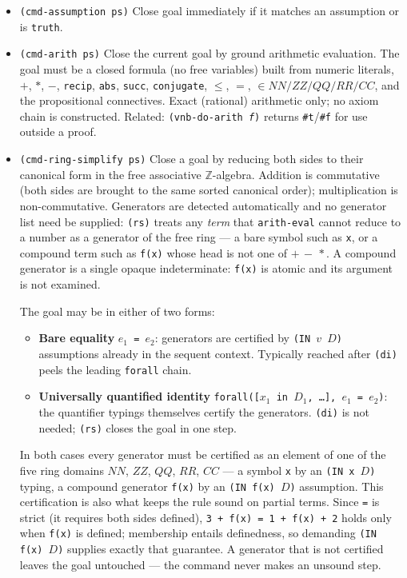 \begin{itemize}
\item \texttt{(cmd-assumption ps)}
  Close goal immediately if it matches an assumption or is \texttt{truth}.

\item \texttt{(cmd-arith ps)}
  Close the current goal by ground arithmetic evaluation.  The goal must
  be a closed formula (no free variables) built from numeric literals,
  $+$, $*$, $-$, \texttt{recip}, \texttt{abs}, \texttt{succ},
  \texttt{conjugate}, $\leq$, $=$,
  $\in \mathit{NN}/\mathit{ZZ}/\mathit{QQ}/\mathit{RR}/\mathit{CC}$,
  and the propositional connectives.  Exact (rational) arithmetic only;
  no axiom chain is constructed.
  Related: \texttt{(vnb-do-arith \textit{f})} returns \texttt{\#t}/\texttt{\#f}
  for use outside a proof.

\item \texttt{(cmd-ring-simplify ps)}
  Close a goal by reducing both sides to their canonical form in the free
  associative $\mathbb{Z}$-algebra.  Addition is commutative (both sides
  are brought to the same sorted canonical order); multiplication is
  non-commutative.  Generators are detected automatically and no generator
  list need be supplied: \texttt{(rs)} treats any \emph{term} that
  \texttt{arith-eval} cannot reduce to a number as a generator of the free
  ring --- a bare symbol such as \texttt{x}, or a compound term such as
  \texttt{f(x)} whose head is not one of $+\,-\,*$.  A compound generator is
  a single opaque indeterminate: \texttt{f(x)} is atomic and its argument is
  not examined.

  The goal may be in either of two forms:
  \begin{itemize}
  \item \textbf{Bare equality} \texttt{$e_1$ = $e_2$}: generators are
    certified by \texttt{(IN $v$ $D$)} assumptions already in the sequent
    context.  Typically reached after \texttt{(di)} peels the leading
    \texttt{forall} chain.
  \item \textbf{Universally quantified identity}
    \texttt{forall([$x_1$ in $D_1$, \ldots], $e_1$ = $e_2$)}: the
    quantifier typings themselves certify the generators.  \texttt{(di)}
    is not needed; \texttt{(rs)} closes the goal in one step.
  \end{itemize}

  In both cases every generator must be certified as an element of one of
  the five ring domains $\mathit{NN}$, $\mathit{ZZ}$, $\mathit{QQ}$,
  $\mathit{RR}$, $\mathit{CC}$ --- a symbol \texttt{x} by an
  \texttt{(IN x $D$)} typing, a compound generator \texttt{f(x)} by an
  \texttt{(IN f(x) $D$)} assumption.  This certification is also what keeps
  the rule sound on partial terms.  Since \texttt{=} is strict (it requires
  both sides defined), \texttt{3 + f(x) = 1 + f(x) + 2}
  holds only when \texttt{f(x)} is defined; membership entails definedness,
  so demanding \texttt{(IN f(x) $D$)} supplies exactly that guarantee.  A
  generator that is not certified leaves the goal untouched --- the command
  never makes an unsound step.


\end{itemize}

